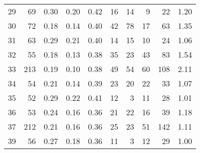 \begin{tabular}{rrrrrrrrrr}
29 &       69 &                             0.30 &                             0.20 &                             0.42 &              16 &              14 &                                  9 &                              22 &       1.20 \\
30 &       72 &                             0.18 &                             0.14 &                             0.40 &              42 &              78 &                                 17 &                              63 &       1.35 \\
31 &       63 &                             0.29 &                             0.21 &                             0.40 &              14 &              15 &                                 10 &                              24 &       1.06 \\
32 &       55 &                             0.18 &                             0.13 &                             0.38 &              35 &              23 &                                 43 &                              83 &       1.54 \\
33 &      213 &                             0.19 &                             0.10 &                             0.38 &              49 &              54 &                                 60 &                             108 &       2.11 \\
34 &       54 &                             0.21 &                             0.14 &                             0.39 &              23 &              20 &                                 22 &                              33 &       1.07 \\
35 &       52 &                             0.29 &                             0.22 &                             0.41 &              12 &               3 &                                 11 &                              28 &       1.01 \\
36 &       53 &                             0.24 &                             0.16 &                             0.36 &              21 &              22 &                                 16 &                              39 &       1.18 \\
37 &      212 &                             0.21 &                             0.16 &                             0.36 &              25 &              23 &                                 51 &                             142 &       1.11 \\
39 &       56 &                             0.27 &                             0.18 &                             0.36 &              11 &               3 &                                 12 &                              29 &       1.00 \\

\end{tabular}
